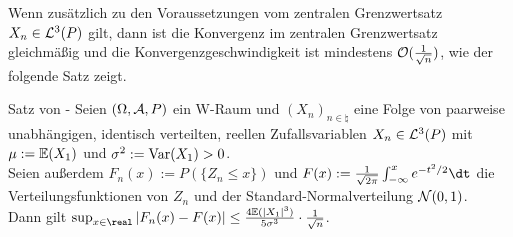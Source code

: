 \linie
\pagebreak

\begin{Bem}
    Wenn zusätzlich zu den Voraussetzungen vom zentralen Grenzwertsatz $X_n \in \mathcal{L}^3(P)$ gilt,
    dann ist die Konvergenz im zentralen Grenzwertsatz gleichmäßig und die
    Konvergenzgeschwindigkeit ist mindestens $\mathcal{O}(\frac{1}{\sqrt{n}})$, wie der folgende
    Satz zeigt.
\end{Bem}

\begin{Satz}{Satz von -}
    Seien $(\Omega, \mathcal{A}, P)$ ein W-Raum und $(X_n)_{n \in \natural}$
    eine Folge von paarweise unabhängigen, identisch verteilten,
    reellen Zufallsvariablen $X_n \in \mathcal{L}^3(P)$ mit $\mu := \mathbb{E}(X_1)$ und
    $\sigma^2 := \text{Var}(X_1) > 0$.\\
    Seien außerdem $F_n(x) := P(\{Z_n \le x\})$ und
    $F(x) := \frac{1}{\sqrt{2\pi}} \int_{-\infty}^x e^{-t^2/2} \dt$
    die Verteilungsfunktionen von $Z_n$ und der Standard-Normalverteilung $\mathcal{N}(0, 1)$.\\
    Dann gilt $\sup_{x \in \real} |F_n(x) - F(x)| \le
    \frac{4 \EW(|X_1|^3)}{5 \sigma^3} \cdot \frac{1}{\sqrt{n}}$.
\end{Satz}

\pagebreak
